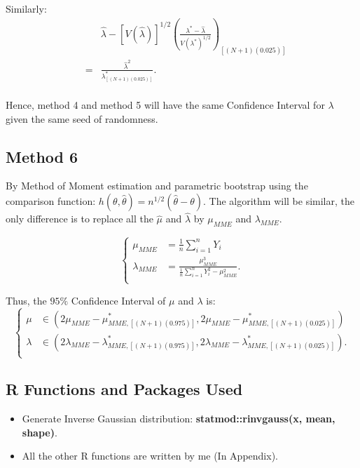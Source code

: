 \documentclass[12pt]{article}
\begin{document}
Similarly:
\begin{eqnarray*}
&&\hat{\lambda}-[V(\hat{\lambda})]^{1/2}(\frac{\lambda^{*}-\hat{\lambda}}{V(\lambda^{*})^{1/2}})_{[(N+1)(0.025)]}\\
&=&\frac{\hat{\lambda}^2}{\lambda_{[(N+1)(0.025)]}^{*}}.\\
\end{eqnarray*}

Hence, method 4 and method 5 will have the same Confidence Interval for $\lambda$ given the same seed of randomness. 

\subsection{Method 6}
By Method of Moment estimation and parametric bootstrap using the comparison function: $h(\theta,\hat{\theta})=n^{1/2}(\hat{\theta}-\theta)$. The algorithm will be similar, the only difference is to replace all the $\hat{\mu}$ and $\hat{\lambda}$ by $\mu_{MME}$ and $\lambda_{MME}$.

 \begin{equation*}
\left\{                         
\begin{aligned}
\mu_{MME} &=\frac{1}{n} \sum_{i=1}^{n}Y_i \\
\lambda_{MME} &= \frac{\mu_{MME}^3}{\frac{1}{n} \sum_{i=1}^{n}Y_{i}^2 -  \mu_{MME}^2}. \\
\end{aligned}
\right.
\end{equation*}

Thus, the $95\%$ Confidence Interval of $\mu$ and $\lambda$ is: 
 \begin{equation*}
\left\{                         
\begin{aligned}
\mu &\in (2\mu_{MME}-\mu_{MME,[(N+1)(0.975)]}^{*},2\mu_{MME}-\mu_{MME,[(N+1)(0.025)]}^{*})\\
\lambda &\in (2\lambda_{MME}-\lambda_{MME,[(N+1)(0.975)]}^{*},2\lambda_{MME}-\lambda_{MME,[(N+1)(0.025)]}^{*}).\\
\end{aligned}
\right.
\end{equation*}



\subsection{R Functions and Packages Used}


\begin{itemize}
  \item Generate Inverse Gaussian distribution: \textbf{statmod::rinvgauss(x, mean, shape)}.
    \item All the other R functions are written by me (In Appendix).
\end{itemize}
\end{document}
